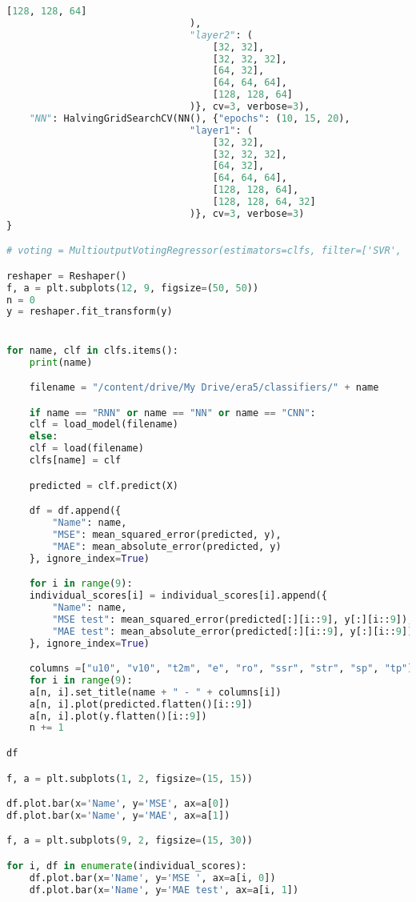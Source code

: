 \begin{lstlisting}[label=python-listing,caption={Kod źródłowy},language=python]
                                    [128, 128, 64]
                                ), 
                                "layer2": (
                                    [32, 32],
                                    [32, 32, 32],
                                    [64, 32],
                                    [64, 64, 64],
                                    [128, 128, 64]
                                )}, cv=3, verbose=3),
    "NN": HalvingGridSearchCV(NN(), {"epochs": (10, 15, 20), 
                                "layer1": (
                                    [32, 32],
                                    [32, 32, 32],
                                    [64, 32],
                                    [64, 64, 64],
                                    [128, 128, 64],
                                    [128, 128, 64, 32]
                                )}, cv=3, verbose=3)
}

# voting = MultioutputVotingRegressor(estimators=clfs, filter=['SVR', 'Logistic Regression', 'SGD', 'PLS', 'Random Forest', 'MLP', 'RNN', 'CNN', 'NN'])

reshaper = Reshaper()
f, a = plt.subplots(12, 9, figsize=(50, 50))
n = 0
y = reshaper.fit_transform(y)


for name, clf in clfs.items():
    print(name)

    filename = "/content/drive/My Drive/era5/classifiers/" + name

    if name == "RNN" or name == "NN" or name == "CNN":
    clf = load_model(filename)
    else:
    clf = load(filename)
    clfs[name] = clf

    predicted = clf.predict(X)

    df = df.append({
        "Name": name,
        "MSE": mean_squared_error(predicted, y),
        "MAE": mean_absolute_error(predicted, y)
    }, ignore_index=True)

    for i in range(9):
    individual_scores[i] = individual_scores[i].append({
        "Name": name,
        "MSE test": mean_squared_error(predicted[:][i::9], y[:][i::9]),
        "MAE test": mean_absolute_error(predicted[:][i::9], y[:][i::9])
    }, ignore_index=True)

    columns =["u10", "v10", "t2m", "e", "ro", "ssr", "str", "sp", "tp"]
    for i in range(9):
    a[n, i].set_title(name + " - " + columns[i])
    a[n, i].plot(predicted.flatten()[i::9])
    a[n, i].plot(y.flatten()[i::9])
    n += 1

df

f, a = plt.subplots(1, 2, figsize=(15, 15))

df.plot.bar(x='Name', y='MSE', ax=a[0])
df.plot.bar(x='Name', y='MAE', ax=a[1])

f, a = plt.subplots(9, 2, figsize=(15, 30))

for i, df in enumerate(individual_scores):
    df.plot.bar(x='Name', y='MSE ', ax=a[i, 0])
    df.plot.bar(x='Name', y='MAE test', ax=a[i, 1])
\end{lstlisting}